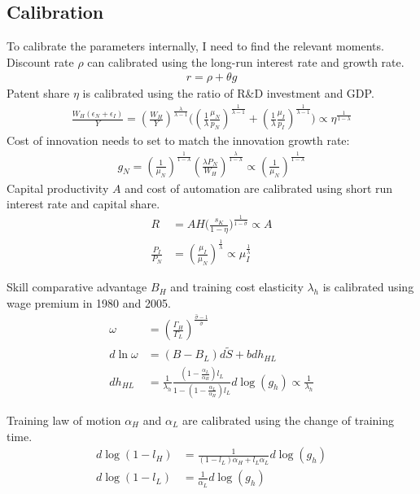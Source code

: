 \documentclass[12pt]{article}
\begin{document}
\subsection*{Calibration}
To calibrate the parameters internally, I need to find the relevant moments. 
Discount rate $\rho$ can calibrated using the long-run interest rate and growth rate. 
\begin{align*}
r = \rho+\theta g
\end{align*}
Patent share $\eta$ is calibrated using the ratio of R\&D investment and GDP. 
\begin{align*}
\frac{W_H(\epsilon_N+\epsilon_I)}{Y} = (\frac{W_H}{Y})^{\frac{\lambda}{\lambda-1}}\Big((\frac{1}{\lambda}\frac{\mu_N}{p_N})^{\frac{1}{\lambda-1}}+(\frac{1}{\lambda}\frac{\mu_I}{p_I})^{\frac{1}{\lambda-1}}\Big) \propto \eta^{\frac{1}{1-\lambda}}
\end{align*}
Cost of innovation needs to set to match the innovation growth rate: 
\begin{align*}
g_N = (\frac{1}{\mu_N})^{\frac{1}{1-\lambda}}(\frac{\lambda P_N}{W_H})^{\frac{\lambda}{1-\lambda}} \propto (\frac{1}{\mu_N})^{\frac{1}{1-\lambda}}
\end{align*}
Capital productivity $A$ and cost of automation are calibrated using short run interest rate and capital share.  
\begin{align*}
R &= AH\Big(\frac{s_K}{1-\eta}\Big)^{\frac{1}{1-\hat{\sigma}}} \propto A \\
\frac{P_I}{P_N} &=(\frac{\mu_I}{\mu_N})^{\frac{1}{\lambda}} \propto \mu_I^{\frac{1}{\lambda}}
\end{align*}

Skill comparative advantage $B_H$ and training cost elasticity $\lambda_h$ is calibrated using wage premium in 1980 and 2005. 
\begin{align*}
\omega &= (\frac{\Gamma_H}{\Gamma_L})^{\frac{{\hat{\sigma}}-1}{\hat{\sigma}}} \\
d \ln \omega &=(B-B_L)d\tilde{S}+bdh_{HL}  \\
dh_{HL} &= \frac{1}{\lambda_h}\frac{(1-\frac{\alpha_L}{\alpha_H})l_L}{1-(1-\frac{\alpha_L}{\alpha_H})l_L}d\log(g_h) \propto \frac{1}{\lambda_h}
\end{align*}

Training law of motion $\alpha_H$ and $\alpha_L$ are calibrated using the change of training time. 
\begin{align*}
d\log(1-l_H) &= \frac{1}{(1-l_L)\alpha_H+l_L\alpha_L}d\log(g_h) \\
d\log(1-l_L) &= \frac{1}{\alpha_L}d\log(g_h) 
\end{align*}
\end{document}

